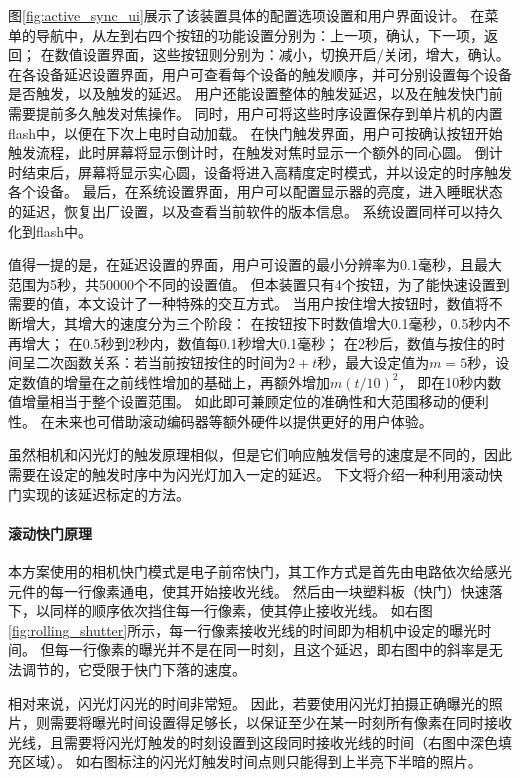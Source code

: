 图\ref{fig:active_sync_ui}展示了该装置具体的配置选项设置和用户界面设计。
在菜单的导航中，从左到右四个按钮的功能设置分别为：上一项，确认，下一项，返回；
在数值设置界面，这些按钮则分别为：减小，切换开启/关闭，增大，确认。
在各设备延迟设置界面，用户可查看每个设备的触发顺序，并可分别设置每个设备是否触发，以及触发的延迟。
用户还能设置整体的触发延迟，以及在触发快门前需要提前多久触发对焦操作。
同时，用户可将这些时序设置保存到单片机的内置flash中，以便在下次上电时自动加载。
在快门触发界面，用户可按确认按钮开始触发流程，此时屏幕将显示倒计时，在触发对焦时显示一个额外的同心圆。
倒计时结束后，屏幕将显示实心圆，设备将进入高精度定时模式，并以设定的时序触发各个设备。
最后，在系统设置界面，用户可以配置显示器的亮度，进入睡眠状态的延迟，恢复出厂设置，以及查看当前软件的版本信息。
系统设置同样可以持久化到flash中。

值得一提的是，在延迟设置的界面，用户可设置的最小分辨率为0.1毫秒，且最大范围为5秒，共50000个不同的设置值。
但本装置只有4个按钮，为了能快速设置到需要的值，本文设计了一种特殊的交互方式。
当用户按住增大按钮时，数值将不断增大，其增大的速度分为三个阶段：
在按钮按下时数值增大0.1毫秒，0.5秒内不再增大；
在0.5秒到2秒内，数值每0.1秒增大0.1毫秒；
在2秒后，数值与按住的时间呈二次函数关系：若当前按钮按住的时间为$2+t$秒，最大设定值为$m=5$秒，设定数值的增量在之前线性增加的基础上，再额外增加$m(t/10)^2$，
即在10秒内数值增量相当于整个设置范围。
如此即可兼顾定位的准确性和大范围移动的便利性。
在未来也可借助滚动编码器等额外硬件以提供更好的用户体验。

虽然相机和闪光灯的触发原理相似，但是它们响应触发信号的速度是不同的，因此需要在设定的触发时序中为闪光灯加入一定的延迟。
下文将介绍一种利用滚动快门实现的该延迟标定的方法。


\paragraph{滚动快门原理}
本方案使用的相机快门模式是电子前帘快门，其工作方式是首先由电路依次给感光元件的每一行像素通电，使其开始接收光线。
然后由一块塑料板（快门）快速落下，以同样的顺序依次挡住每一行像素，使其停止接收光线。
如右图\ref{fig:rolling_shutter}所示，每一行像素接收光线的时间即为相机中设定的曝光时间。
但每一行像素的曝光并不是在同一时刻，且这个延迟，即右图中的斜率是无法调节的，它受限于快门下落的速度。

相对来说，闪光灯闪光的时间非常短。
因此，若要使用闪光灯拍摄正确曝光的照片，则需要将曝光时间设置得足够长，以保证至少在某一时刻所有像素在同时接收光线，且需要将闪光灯触发的时刻设置到这段同时接收光线的时间（右图中深色填充区域）。
如右图标注的闪光灯触发时间点则只能得到上半亮下半暗的照片。

